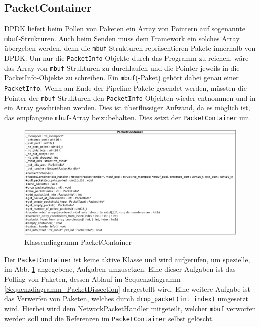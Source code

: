 \documentclass[../review_2.tex]{subfiles}
\begin{document}
\subsection{PacketContainer}
DPDK liefert beim Pollen von Paketen ein Array von Pointern auf sogenannte \texttt{mbuf}-Strukturen. Auch beim Senden muss dem Framework ein solches Array übergeben werden, denn die \texttt{mbuf}-Strukturen repräsentieren Pakete innerhalb von DPDK. Um nur die \texttt{PacketInfo}-Objekte durch das Programm zu reichen, wäre das Array von \texttt{mbuf}-Strukturen zu durchlaufen und die Pointer jeweils in die PacketInfo-Objekte zu schreiben. Ein \texttt{mbuf}(-Paket) gehört dabei genau einer \texttt{PacketInfo}. Wenn am Ende der Pipeline Pakete gesendet werden, müssten die Pointer der \texttt{mbuf}-Strukturen den \texttt{PacketInfo}-Objekten wieder entnommen und in ein Array geschrieben werden. Dies ist überflüssiger Aufwand, da es möglich ist, das empfangene \texttt{mbuf}-Array beizubehalten. Dies setzt der \texttt{PacketContainer} um.

\begin{figure}
	\centering
	\includegraphics[width=\linewidth]{img/PacketContainerClass.pdf}
	\caption{Klassendiagramm PacketContainer}
	\label{Klassendiagramm_PacketContainer}
\end{figure}

Der \texttt{PacketContainer} ist keine aktive Klasse und wird aufgerufen, um spezielle, im Abb. \ref{Klassendiagramm_PacketContainer} angegebene, Aufgaben umzusetzen. Eine dieser Aufgaben ist das Polling von Paketen, dessen Ablauf im Sequenzdiagramm \ref{Sequenzdiagramm_PacketDissection} dargestellt wird. Eine weitere Aufgabe ist das Verwerfen von Paketen, welches durch \texttt{drop\_packet(int index)} umgesetzt wird. Hierbei wird dem NetworkPacketHandler mitgeteilt, welcher \texttt{mbuf} verworfen werden soll und die Referenzen im \texttt{PacketContainer} selbst gelöscht.
\end{document}
